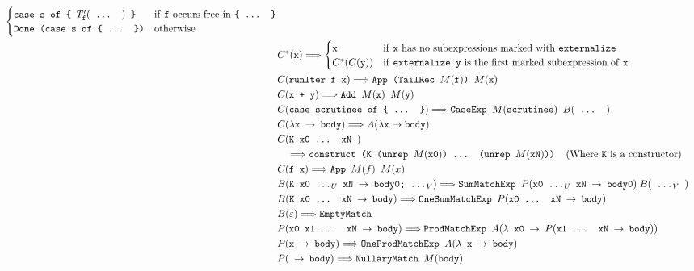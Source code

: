 \documentclass[runningheads, a4paper]{llncs}
\newcommand{\expr}[1]{(#1)} %
\newcommand{\rarr}{\rightarrow}
\newcommand{\rewrites}{\Longrightarrow}
\newcommand{\ttt}{\texttt}
\begin{document}
\begin{figure}
{\begin{minipage}{\linewidth}
\begin{align*}
\begin{cases}
        \ttt{case s of \{ $T'_{\ttt{f}}\expr{\ttt{ ... }}$ \}} & \text{if \ttt{f} occurs free in \ttt{\{ ... \}}}\\
        \ttt{Done (case s of \{ ... \})} & \text{otherwise}
      \end{cases}\\
  &C^{*}\expr{\ttt{x}} \rewrites
    \begin{cases}
      \ttt{x} & \text{if \ttt{x} has no subexpressions marked with \ttt{externalize}}\\
      C^{*}\expr{C\expr{\ttt{y}}} & \text{if \ttt{externalize y} is the first marked subexpression of \ttt{x}}\\
    \end{cases}\\
  &C\expr{\ttt{runIter f x}} \rewrites \ttt{App (TailRec $M\expr{\ttt{f}}$) $M\expr{\ttt{x}}$}\\
  &C\expr{\ttt{x + y}} \rewrites \ttt{Add $M\expr{\ttt{x}}$ $M\expr{\ttt{y}}$}\\
  &C\expr{\ttt{case scrutinee of \{ ... \}}} \rewrites \ttt{CaseExp $M\expr{\ttt{scrutinee}}$ } B\expr{\ttt{ ... }}\\
  &C\expr{\ttt{$\lambda$x $\rarr$ body}} \rewrites A\expr{\lambda \ttt{x} \rarr \ttt{body}}\\
  &C\expr{\ttt{K x0 ... xN }}\\
    &\quad\rewrites \ttt{construct (K (unrep $M\expr{\ttt{x0}}$) ... (unrep $M\expr{\ttt{xN}}$))}\;\;\;\;\text{(Where \ttt{K} is a constructor)}\\
  &C\expr{\ttt{f x}} \rewrites \ttt{App $M\expr{f}$ $M\expr{x}$}\\
  &B\expr{\ttt{K x0 ...$_U$ xN $\rarr$ body0; ...$_V$}} \rewrites \ttt{SumMatchExp }P\expr{\ttt{x0 ...$_U$ xN $\rarr$ body0}}\; B\expr{\ttt{ ...$_V$ }}\\
  &B\expr{\ttt{K x0 ... xN $\rarr$ body}} \rewrites \ttt{OneSumMatchExp }P\expr{\ttt{x0 ... xN $\rarr$ body}}\\
  &B\expr{\ttt{$\varepsilon$}} \rewrites \ttt{EmptyMatch}\\
  &P\expr{\ttt{x0 x1 ... xN $\rarr$ body}} \rewrites \ttt{ProdMatchExp }A\expr{\ttt{$\lambda$ x0 $\rarr$ $P\expr{\ttt{x1 ... xN $\rarr$ body}}$}}\\
  &P\expr{\ttt{x $\rarr$ body}} \rewrites \ttt{OneProdMatchExp }A\expr{\ttt{$\lambda$ x $\rarr$ body}}\\
  &P\expr{\ttt{ $\rarr$ body}} \rewrites \ttt{NullaryMatch $M\expr{\ttt{body}}$}\\

\end{align*}
\end{minipage}}
\end{figure}
\end{document}
